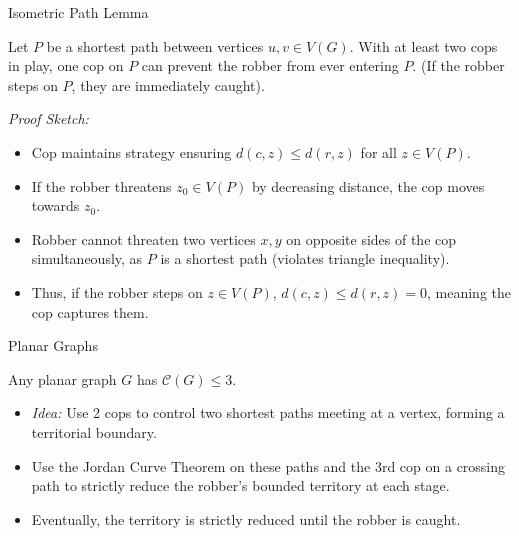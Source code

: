 \documentclass[10pt, aspectratio=169]{beamer}
\begin{document}
\begin{frame}{Isometric Path Lemma}
    \begin{lemma}
        Let $P$ be a shortest path between vertices $u, v \in V(G)$. With at least two cops in play, one cop on $P$ can prevent the robber from ever entering $P$. (If the robber steps on $P$, they are immediately caught).
    \end{lemma}
    \textit{Proof Sketch:}
    \begin{itemize}
        \item Cop maintains strategy ensuring $d(c,z) \le d(r,z)$ for all $z \in V(P)$.
        \item If the robber threatens $z_0 \in V(P)$ by decreasing distance, the cop moves towards $z_0$.
        \item Robber cannot threaten two vertices $x, y$ on opposite sides of the cop simultaneously, as $P$ is a shortest path (violates triangle inequality).
        \item Thus, if the robber steps on $z \in V(P)$, $d(c,z) \le d(r,z) = 0$, meaning the cop captures them.
    \end{itemize}
\end{frame}

\begin{frame}{Planar Graphs}
    \begin{theorem}
        Any planar graph $G$ has $\mathcal{C}(G) \le 3$.
    \end{theorem}
    \begin{itemize}
        \item \textit{Idea:} Use 2 cops to control two shortest paths meeting at a vertex, forming a territorial boundary.
        \item Use the Jordan Curve Theorem on these paths and the 3rd cop on a crossing path to strictly reduce the robber's bounded territory at each stage.
        \item Eventually, the territory is strictly reduced until the robber is caught.
    \end{itemize}
\end{frame}
\end{document}
